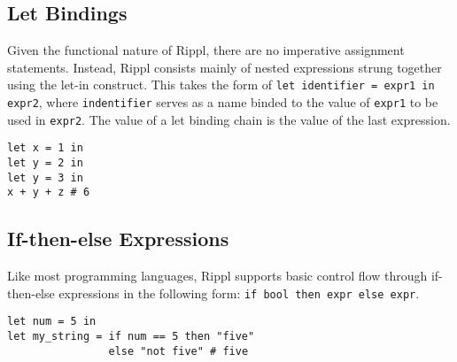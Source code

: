 \documentclass[5pt]{article}
\begin{document}
\subsection{Let Bindings}
Given the functional nature of Rippl, there are no imperative assignment statements. Instead, Rippl consists mainly of nested expressions strung together
using the let-in construct. This takes the form of \texttt{let identifier = expr1 in expr2}, where \texttt{indentifier} serves as a name binded to the value of \texttt{expr1} to be used in \texttt{expr2}. The value of a let binding chain is the value of the last expression.
\begin{lstlisting}[language=rippl]
let x = 1 in 
let y = 2 in 
let y = 3 in
x + y + z # 6
\end{lstlisting}

\subsection{If-then-else Expressions}
Like most programming languages, Rippl supports basic control flow through if-then-else expressions in the following form:
\texttt{if bool then expr else expr}. %

\begin{lstlisting}[language=rippl]
let num = 5 in
let my_string = if num == 5 then "five" 
				else "not five" # five
\end{lstlisting}
\end{document}
